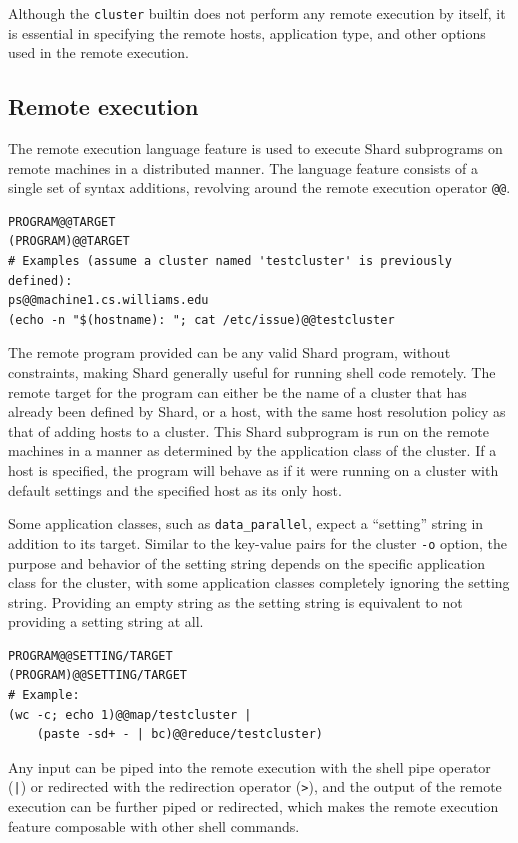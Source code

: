 \documentclass[twoside]{report}
\begin{document}
Although the \texttt{cluster} builtin does not perform any remote execution by itself, it is essential in specifying the remote hosts, application type, and other options used in the remote execution.

\subsection{Remote execution}
The remote execution language feature is used to execute Shard subprograms on remote machines in a distributed manner.
The language feature consists of a single set of syntax additions, revolving around the remote execution operator \texttt{@@}.

\begin{lstlisting}[language=Shard]
PROGRAM@@TARGET
(PROGRAM)@@TARGET
# Examples (assume a cluster named 'testcluster' is previously defined):
ps@@machine1.cs.williams.edu
(echo -n "$(hostname): "; cat /etc/issue)@@testcluster
\end{lstlisting}

The remote program provided can be any valid Shard program, without constraints, making Shard generally useful for running shell code remotely.
The remote target for the program can either be the name of a cluster that has already been defined by Shard, or a host, with the same host resolution policy as that of adding hosts to a cluster.
This Shard subprogram is run on the remote machines in a manner as determined by the application class of the cluster.
If a host is specified, the program will behave as if it were running on a cluster with default settings and the specified host as its only host.

Some application classes, such as \texttt{data\_parallel}, expect a ``setting'' string in addition to its target.
Similar to the key-value pairs for the cluster \texttt{-o} option, the purpose and behavior of the setting string depends on the specific application class for the cluster, with some application classes completely ignoring the setting string.
Providing an empty string as the setting string is equivalent to not providing a setting string at all.

\begin{lstlisting}[language=Shard]
PROGRAM@@SETTING/TARGET
(PROGRAM)@@SETTING/TARGET
# Example:
(wc -c; echo 1)@@map/testcluster |
    (paste -sd+ - | bc)@@reduce/testcluster)
\end{lstlisting}

Any input can be piped into the remote execution with the shell pipe operator (\texttt{|}) or redirected with the redirection operator (\texttt{>}), and the output of the remote execution can be further piped or redirected, which makes the remote execution feature composable with other shell commands.
\end{document}
